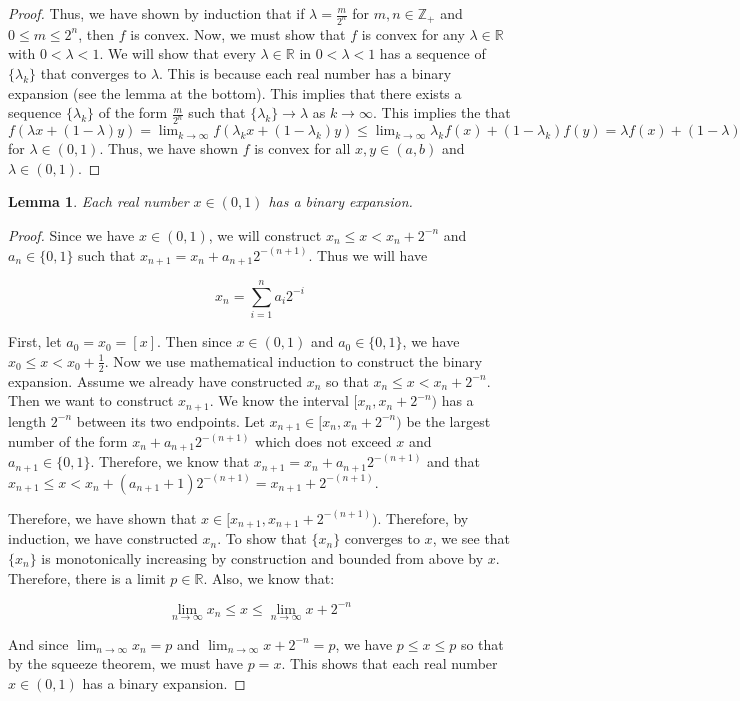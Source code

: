 \documentclass[psamsfonts]{amsart}
\newtheorem{lem}[thm]{Lemma}
\theoremstyle{definition}
\theoremstyle{remark}
\numberwithin{equation}{section}
\begin{document}
\begin{proof}
Thus, we have shown by induction that if $\lambda = \frac{m}{2^n}$ for $m,n \in \mathbb{Z}_+$ and $0 \leq m \leq 2^n$, then $f$ is convex. Now, we must show that $f$ is convex for any $\lambda \in \mathbb{R}$ with $0 < \lambda < 1$. We will show that every $\lambda \in \mathbb{R}$ in $0 < \lambda < 1$ has a sequence of $\{ \lambda_k \}$ that converges to $\lambda$. This is because each real number has a binary expansion (see the lemma at the bottom). This implies that there exists a sequence $\{ \lambda_k \}$ of the form $\frac{m}{2^n}$ such that $\{ \lambda_k \} \rightarrow \lambda$ as $k \rightarrow \infty$. This implies the that $f(\lambda x + (1 - \lambda) y) = \lim_{k \to \infty} f(\lambda_k x + (1 - \lambda_k) y) \leq \lim_{k \to \infty} \lambda_k f(x) + (1 - \lambda_k ) f(y) = \lambda f(x) + (1 - \lambda) f(x)$ for $\lambda \in (0,1)$. Thus, we have shown $f$ is convex for all $x,y \in (a,b)$ and $\lambda \in (0,1)$.
\end{proof}

\begin{lem}
Each real number $x \in (0,1)$ has a binary expansion.
\end{lem}

\begin{proof}
Since we have $x \in (0,1)$, we will construct $x_n \leq x < x_n + 2^{-n}$ and $a_n \in \{0,1\}$ such that $x_{n+1} = x_n + a_{n+1} 2^{-(n+1)}$. Thus we will have 

\begin{equation}
x_n = \sum_{i = 1}^n a_i 2^{-i}
\end{equation}

First, let $a_0 = x_0 = [x]$. Then since $x \in (0,1)$ and $a_0 \in \{0,1\}$, we have $x_0 \leq x < x_0 + \frac{1}{2}$. Now we use mathematical induction to construct the binary expansion. Assume we already have constructed $x_n$ so that $x_n \leq x < x_n + 2^{-n}$. Then we want to construct $x_{n+1}$. We know the interval $[x_n, x_n + 2^{-n})$ has a length $2^{-n}$ between its two endpoints. Let $x_{n+1} \in [x_n, x_n + 2^{-n})$ be the largest number of the form $x_n + a_{n+1} 2^{-(n+1)}$ which does not exceed $x$ and $a_{n+1} \in \{0,1\}$. Therefore, we know that $x_{n+1} = x_n + a_{n+1} 2^{-(n+1)}$ and that $x_{n+1} \leq x < x_n + (a_{n+1} + 1) 2^{-(n+1)} = x_{n+1} + 2^{-(n+1)}$.

Therefore, we have shown that $x \in [x_{n+1}, x_{n+1} + 2^{-(n+1)})$. Therefore, by induction, we have constructed $x_n$. To show that $\{x_n \}$ converges to $x$, we see that $\{x_n\}$ is monotonically increasing by construction and bounded from above by $x$. Therefore, there is a limit $p \in \mathbb{R}$. Also, we know that:

\begin{equation}
\lim_{n \to \infty} x_n \leq x \leq \lim_{n \to \infty} x + 2^{-n}
\end{equation}

And since $\lim_{n \to \infty} x_n = p$ and $\lim_{n \to \infty} x + 2^{-n} = p$, we have $p \leq x \leq p$ so that by the squeeze theorem, we must have $ p = x$. This shows that each real number $x \in (0,1)$ has a binary expansion.
\end{proof}
\end{document}
